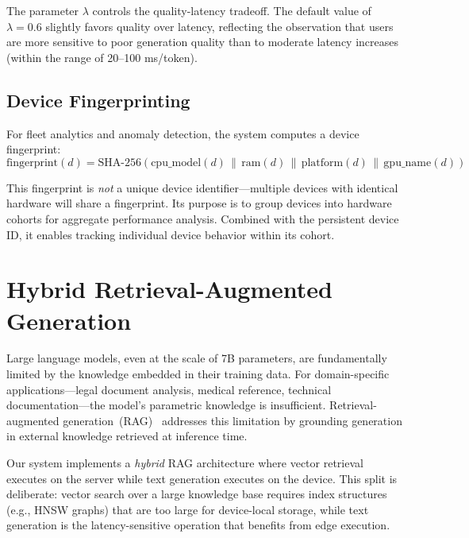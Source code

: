 \documentclass[12pt, letterpaper, twoside]{report}
\begin{document}
The parameter $\lambda$ controls the quality-latency tradeoff. The default value of $\lambda = 0.6$ slightly favors quality over latency, reflecting the observation that users are more sensitive to poor generation quality than to moderate latency increases (within the range of 20--100 ms/token).

\section{Device Fingerprinting}
\label{sec:fingerprinting}

For fleet analytics and anomaly detection, the system computes a device fingerprint:
\begin{equation}
\text{fingerprint}(d) = \text{SHA-256}(\text{cpu\_model}(d) \,\|\, \text{ram}(d) \,\|\, \text{platform}(d) \,\|\, \text{gpu\_name}(d))
\end{equation}

This fingerprint is \textit{not} a unique device identifier---multiple devices with identical hardware will share a fingerprint. Its purpose is to group devices into hardware cohorts for aggregate performance analysis. Combined with the persistent device ID, it enables tracking individual device behavior within its cohort.

\chapter{Hybrid Retrieval-Augmented Generation}
\label{ch:rag}

Large language models, even at the scale of 7B parameters, are fundamentally limited by the knowledge embedded in their training data. For domain-specific applications---legal document analysis, medical reference, technical documentation---the model's parametric knowledge is insufficient. Retrieval-augmented generation~(RAG)~\cite{lewis2020retrieval} addresses this limitation by grounding generation in external knowledge retrieved at inference time.

Our system implements a \textit{hybrid} RAG architecture where vector retrieval executes on the server while text generation executes on the device. This split is deliberate: vector search over a large knowledge base requires index structures (e.g., HNSW graphs) that are too large for device-local storage, while text generation is the latency-sensitive operation that benefits from edge execution.
\end{document}
